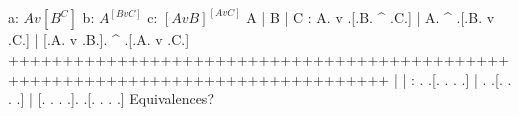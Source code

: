 \list
a: $ A v [B ^ C] $
b: $ A ^ [B v C] $
c: $ [A v B] ^ [A v C] $
\endlist
        \answer
        \truthtable
         A | B | C : A. v .[.B. ^ .C.] | A. ^ .[.B. v .C.] | [.A. v .B.]. ^ .[.A. v .C.]
        +++++++++++++++++++++++++++++++++++++++++++++++++++++++++++++++++++++++++++++++++
           |   |   :  .   .[. .   . .] |  .   .[. .   . .] | [. .   . .].   .[. .   . .]
        \endtruthtable
        Equivalences?
        \endanswer

\endproblems
\bye

